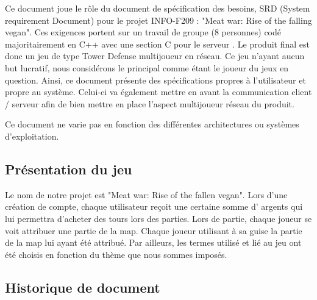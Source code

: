 \documentclass[12pt,a4paper]{article}
\begin{document}
Ce document joue le rôle du document de spécification des besoins, SRD (System requirement Document) pour le projet INFO-F209 : "Meat war: Rise of the falling vegan".
	Ces exigences portent sur un travail de groupe (8 personnes) codé majoritairement en C++ avec une section C pour le \gls{serveur} . Le produit final est donc un jeu de type \gls{Tower Defense}  multijoueur en réseau.
Ce jeu n'ayant aucun but lucratif, nous considérons le  principal comme étant le \gls{joueur} du jeux en question.
Ainsi, ce document présente des spécifications propres à l'\gls{utilisateur} et propre au système. Celui-ci va également mettre en avant la communication \gls{client} / \gls{serveur}  afin de bien mettre en place l'aspect multijoueur réseau du produit. 


 Ce document ne varie pas en fonction des différentes architectures ou systèmes d'exploitation.

\subsection{Présentation du jeu}
 Le nom de notre projet est "Meat war: Rise of the fallen vegan".
Lors d'une création de \gls{compte}, chaque \gls{utilisateur} reçoit une certaine somme d' \glspl{argent}  qui lui permettra d'acheter des tours  lors des parties.
\noindent Lors de partie, chaque \gls{joueur} se voit attribuer une partie de la \gls{map}. Chaque \gls{joueur} utilisant à sa guise la partie de la \gls{map} lui ayant été attribué. Par ailleurs, les termes utilisé et lié au jeu ont été choisis en fonction du thème que nous sommes imposés.

\glsaddall
\printglossary[numberedsection]

\subsection{Historique de document}
\end{document}
